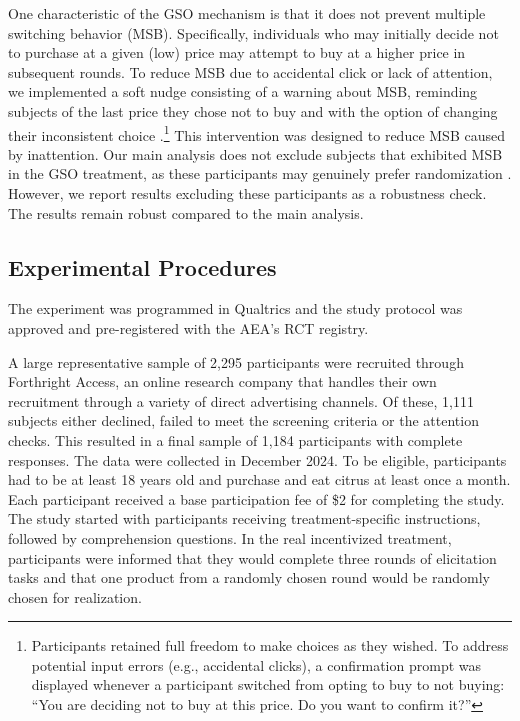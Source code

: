 \documentclass[12pt]{article}
\begin{document}
One characteristic of the GSO mechanism is that it does not prevent multiple switching behavior (MSB). Specifically, individuals who may initially decide not to purchase at a given (low) price may attempt to buy at a higher price in subsequent rounds. To reduce MSB due to accidental click or lack of attention, we implemented a soft nudge consisting of a warning about MSB, reminding subjects of the last price they chose not to buy and with the option of changing their inconsistent choice \citep{yu2021multiple}.\footnote{Participants retained full freedom to make choices as they wished. To address potential input errors (e.g., accidental clicks), a confirmation prompt was displayed whenever a participant switched from opting to buy to not buying: ``You are deciding not to buy at this price. Do you want to confirm it?''} 
This intervention was designed to reduce MSB caused by inattention. Our main analysis does not exclude subjects that exhibited MSB in the GSO treatment, as these participants may genuinely prefer randomization \citep{agranov2017stochastic}. However, we report results excluding these participants as a robustness check. The results remain robust compared to the main analysis.
    
\subsection{Experimental Procedures}
The experiment was programmed in Qualtrics and the study protocol was approved %
and pre-registered with the AEA's RCT registry.

A large representative sample of 2,295 participants were recruited through Forthright Access, an online research company that handles their own recruitment through a variety of direct advertising channels. Of these, 1,111 subjects either declined, failed to meet the screening criteria or the attention checks. This resulted in a final sample of 1,184 participants with complete responses. The data were collected in December 2024. To be eligible, participants had to be at least 18 years old and purchase and eat citrus at least once a month. 
Each participant received a base participation fee of \$2 for completing the study. The study started with participants receiving treatment-specific instructions, followed by comprehension questions. In the real incentivized treatment, participants were informed that they would complete three rounds of elicitation tasks and that one product from a randomly chosen round would be randomly chosen for realization. 
\end{document}
